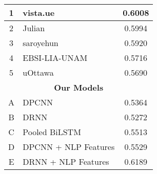 \documentclass[sigconf]{acmart}
\begin{document}
\begin{table*}[h]
\begin{minipage}{0.49\textwidth}
{\begin{tabular}{|c|l|c|}
1                                                                        & vista.ue\cite{raiyani2018fully}                & 0.6008                                                                     \\ \hline
2                                                                        & Julian\cite{risch2018aggression}               & 0.5994                                                                     \\ \hline
3                                                                        & saroyehun\cite{aroyehun2018aggression}         & 0.5920                                                                     \\ \hline
4                                                                        & EBSI-LIA-UNAM\cite{arroyo2018cyberbullying} & 0.5716                                                                     \\ \hline
5                                                                        & uOttawa\cite{orabi2018cyber}                   & 0.5690                                                                     \\ \hline
\multicolumn{3}{|c|}{\textbf{Our Models}}                                                                                                                                                              \\ \hline
A                                                                        & DPCNN                                              &  0.5364                                                                          \\ \hline
B                                                                        & DRNN                                              &  0.5272                                                                          \\ \hline
C                                                                        & Pooled BiLSTM                                              &  0.5513                                                                          \\ \hline
D                                                                        & DPCNN + NLP Features                                 &  0.5529                                                                         \\ \hline
E                                                                        & DRNN + NLP Features                                 &    0.6189                                                                       \\ \hline

\end{tabular}}
\end{minipage}
\end{table*}
\end{document}
